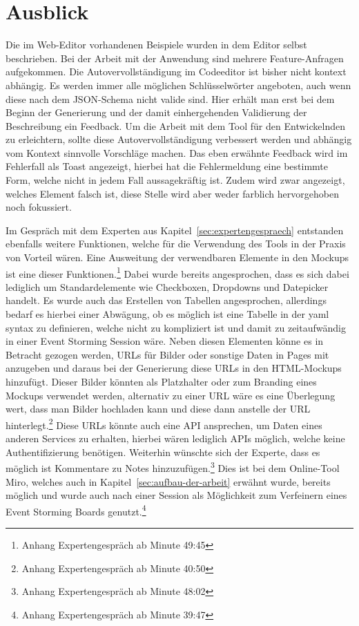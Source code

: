 \chapter{Ausblick}\label{ch:ausblick}

Die im Web-Editor vorhandenen Beispiele wurden in dem Editor selbst beschrieben.
Bei der Arbeit mit der Anwendung sind mehrere Feature-Anfragen aufgekommen.
Die Autovervollständigung im Codeeditor ist bisher nicht kontext abhängig.
Es werden immer alle möglichen Schlüsselwörter angeboten, auch wenn diese nach dem JSON-Schema nicht valide sind.
Hier erhält man erst bei dem Beginn der Generierung und der damit einhergehenden Validierung der Beschreibung ein Feedback.
Um die Arbeit mit dem Tool für den Entwickelnden zu erleichtern, sollte diese Autovervollständigung verbessert werden und abhängig vom Kontext
sinnvolle Vorschläge machen.
Das eben erwähnte Feedback wird im Fehlerfall als Toast angezeigt, hierbei hat die Fehlermeldung eine bestimmte Form, welche nicht in jedem Fall aussagekräftig ist.
Zudem wird zwar angezeigt, welches Element falsch ist, diese Stelle wird aber weder farblich hervorgehoben noch fokussiert.

Im Gespräch mit dem Experten aus Kapitel~\ref{sec:expertengespraech} entstanden ebenfalls weitere Funktionen, welche für die Verwendung des Tools in der Praxis von Vorteil wären.
Eine Ausweitung der verwendbaren Elemente in den Mockups ist eine dieser Funktionen.\footnote{Anhang Expertengespräch ab Minute 49:45}
Dabei wurde bereits angesprochen, dass es sich dabei lediglich um Standardelemente wie Checkboxen, Dropdowns und Datepicker handelt.
Es wurde auch das Erstellen von Tabellen angesprochen, allerdings bedarf es hierbei einer Abwägung, ob es möglich ist eine Tabelle in der yaml syntax zu definieren,
welche nicht zu kompliziert ist und damit zu zeitaufwändig in einer Event Storming Session wäre.
Neben diesen Elementen könne es in Betracht gezogen werden, URLs für Bilder oder sonstige Daten in Pages mit anzugeben und
daraus bei der Generierung diese URLs in den HTML-Mockups hinzufügt.
Dieser Bilder könnten als Platzhalter oder zum Branding eines Mockups verwendet werden, alternativ zu einer URL wäre es eine Überlegung wert, dass man Bilder hochladen kann und
diese dann anstelle der URL hinterlegt.\footnote{Anhang Expertengespräch ab Minute 40:50}
Diese URLs könnte auch eine API ansprechen, um Daten eines anderen Services zu erhalten, hierbei wären lediglich APIs möglich, welche keine Authentifizierung benötigen.
Weiterhin wünschte sich der Experte, dass es möglich ist Kommentare zu Notes hinzuzufügen.\footnote{Anhang Expertengespräch ab Minute 48:02}
Dies ist bei dem Online-Tool Miro, welches auch in Kapitel~\ref{sec:aufbau-der-arbeit} erwähnt wurde, bereits möglich und wurde auch nach einer Session als Möglichkeit
zum Verfeinern eines Event Storming Boards genutzt.\footnote{Anhang Expertengespräch ab Minute 39:47}

